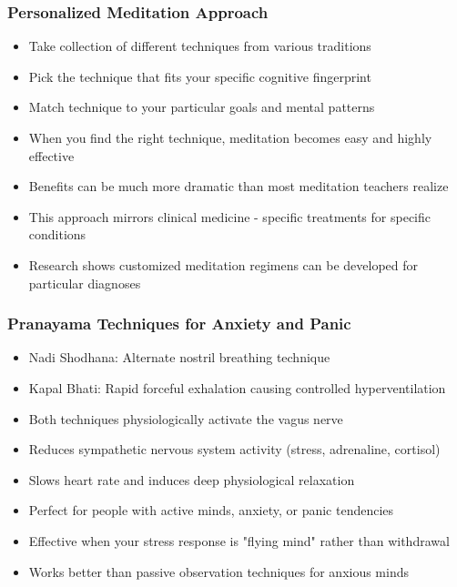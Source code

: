 \begin{frame}[fragile]\frametitle{Personalized Meditation Approach}
      \begin{itemize}
	\item Take collection of different techniques from various traditions
	\item Pick the technique that fits your specific cognitive fingerprint
	\item Match technique to your particular goals and mental patterns
	\item When you find the right technique, meditation becomes easy and highly effective
	\item Benefits can be much more dramatic than most meditation teachers realize
	\item This approach mirrors clinical medicine - specific treatments for specific conditions
	\item Research shows customized meditation regimens can be developed for particular diagnoses
	  \end{itemize}
\end{frame}

\begin{frame}[fragile]\frametitle{Pranayama Techniques for Anxiety and Panic}
      \begin{itemize}
	\item Nadi Shodhana: Alternate nostril breathing technique
	\item Kapal Bhati: Rapid forceful exhalation causing controlled hyperventilation
	\item Both techniques physiologically activate the vagus nerve
	\item Reduces sympathetic nervous system activity (stress, adrenaline, cortisol)
	\item Slows heart rate and induces deep physiological relaxation
	\item Perfect for people with active minds, anxiety, or panic tendencies
	\item Effective when your stress response is "flying mind" rather than withdrawal
	\item Works better than passive observation techniques for anxious minds
	  \end{itemize}
\end{frame}

